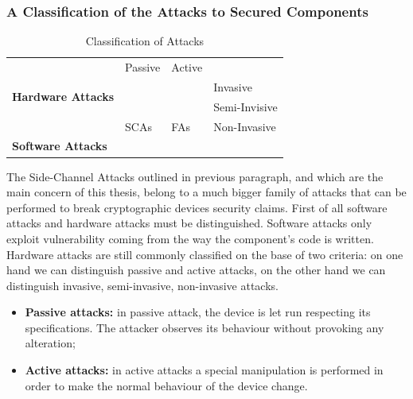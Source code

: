 \subsubsection{A Classification of the Attacks to Secured Components}\label{sec:classification_attacks}
\begin{table}[]
\centering
\caption{Classification of Attacks}
\label{fig:classification_attacks}
\begin{tabular}{|l|lll}
\cline{1-3}
\multirow{4}{*}{\textbf{Hardware Attacks}} & \multicolumn{1}{l|}{Passive} & \multicolumn{1}{l|}{Active} &                                    \\ \cline{2-4} 
                                           & \multicolumn{1}{l|}{}        & \multicolumn{1}{l|}{}       & \multicolumn{1}{l|}{Invasive}      \\ \cline{2-4} 
                                           & \multicolumn{1}{l|}{}        & \multicolumn{1}{l|}{}       & \multicolumn{1}{l|}{Semi-Invisive} \\ \cline{2-4} 
                                           & \multicolumn{1}{l|}{SCAs}    & \multicolumn{1}{l|}{FAs}    & \multicolumn{1}{l|}{Non-Invasive}  \\ \hline
\textbf{Software Attacks}                  &                              &                             &                                    \\ \cline{1-1}
\end{tabular}
\end{table}

The Side-Channel Attacks outlined in previous paragraph, and which are the main concern of this thesis,  belong to a much bigger family of attacks that can be performed to break cryptographic devices security claims. First of all software attacks and hardware attacks must be distinguished. Software attacks only exploit vulnerability coming from the way the component's code is written. Hardware attacks are still commonly classified on the base of two criteria: on one hand we can distinguish passive and active attacks, on the other hand we can distinguish invasive, semi-invasive, non-invasive attacks. 
\begin{itemize}
\item[] \textbf{Passive attacks:} in passive attack, the device is let run respecting its specifications. The attacker observes its behaviour without provoking any alteration;
\item[] \textbf{Active attacks:}  in active attacks a special manipulation is performed in order to make the normal behaviour of the device change. 
\end{itemize}


